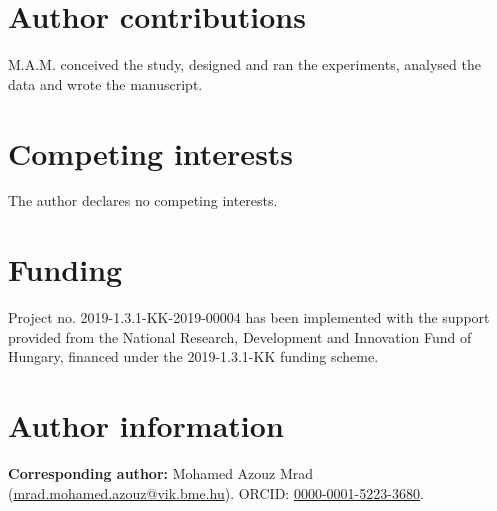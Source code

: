 \documentclass[fleqn,10pt]{wlscirep}
\begin{document}



\section*{Author contributions}

M.A.M. conceived the study, designed and ran the experiments, analysed the data and wrote the manuscript.

\section*{Competing interests}

The author declares no competing interests.

\section*{Funding}

Project no. 2019-1.3.1-KK-2019-00004 has been implemented with the support provided from the National Research, Development and Innovation Fund of Hungary, financed under the 2019-1.3.1-KK funding scheme.


\section*{Author information}

\textbf{Corresponding author:}  Mohamed Azouz Mrad (\href{mailto:mrad.mohamed.azouz@vik.bme.hu}{mrad.mohamed.azouz@vik.bme.hu}). ORCID: \href{https://orcid.org/0000-0001-5223-3680}{0000-0001-5223-3680}.
\end{document}
